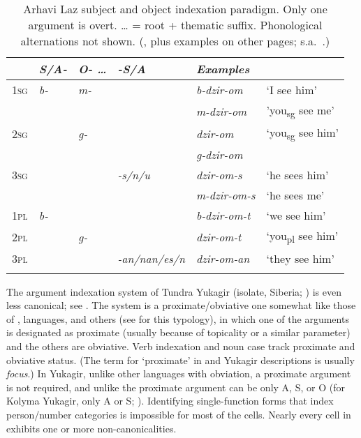 \documentclass[output=collectionpaper]{langsci/langscibook}
\begin{document}
\begin{table}[t]
\caption{Arhavi Laz subject and object indexation paradigm. Only one argument is overt. … = root + thematic suffix. Phonological alternations not shown. (\citealt[283, 298]{Lacroix2009}, plus examples on other pages; s.a.\ \citealt[51]{Oeztuerk2011}.)}
\label{extab:Nich:16}

\begin{tabularx}{\textwidth}{l>{\itshape}X>{\itshape}X>{\itshape}l>{\itshape}ll}
\lsptoprule
	 &	{\normalfont S/A-} &	{\normalfont O-}  …  & {\normalfont -S/A}	 & {\normalfont Examples}				\\
			 \midrule
	\textsc{1sg} &	b- &	m- & &	 		b-dzir-om	 & `I see him'  \\
&&&&						m-dzir-om	  &'you\textsubscript{sg} see me'\\

	\textsc{2sg}	 & &	g-  & &		  	   dzir-om &	 `you\textsubscript{sg} see him' \\
			 & & & &			g-dzir-om \\
	\textsc{3sg}	 & & &		-s/n/u	 &	   dzir-om-s	 & `he sees him'\\
		 & &	 & &			m-dzir-om-s	 & `he sees me'\\
		 \tablevspace
\noalign{}
	\textsc{1pl}	 &b-	 & & &			b-dzir-om-t	 & `we see him'	\\
	\textsc{2pl} & &		g-	 & &		   dzir-om-t	 & `you\textsubscript{pl} see him' \\
	\textsc{3pl}	 & & &		\mbox{-an/nan/es/n}	 &   dzir-om-an	 & `they see him'
\\\lspbottomrule\end{tabularx}
\end{table}

The argument indexation system of Tundra Yukagir (isolate, Siberia; \citealt{Maslov2003}) is even less canonical; see . The system is a proximate/obviative one somewhat like those of ,  languages, and others (see \citealt{Bickel2011} for this typology), in which one of the arguments is designated as proximate (usually because of topicality or a similar parameter) and the others are obviative. Verb indexation and noun case track proximate and obviative status. (The term for `proximate' in  and Yukagir descriptions is usually \textit{focus}.) In Yukagir, unlike other languages with obviation, a proximate argument is not required, and unlike  the proximate argument can be only A, S, or O (for Kolyma Yukagir, only A or S; \citealt{Maslov2003a}). Identifying single-function forms that index person/number categories is impossible for most of the cells. Nearly every cell in  exhibits one or more non-canonicalities.
\end{document}
